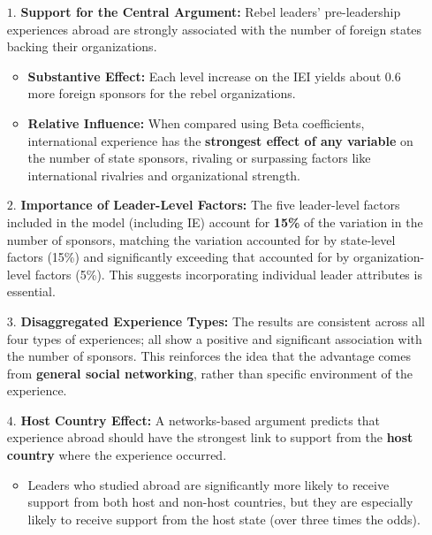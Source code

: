 \documentclass{article}
\begin{document}
    \begin{itemize}
        \item [$1$.] \textbf{Support for the Central Argument:} Rebel
        leaders' pre-leadership experiences abroad are strongly associated
        with the number of foreign states backing their organizations.
        \begin{itemize}
            \item \textbf{Substantive Effect:} Each level increase on the
            IEI yields about 0.6 more foreign sponsors for the rebel
            organizations.
            \item \textbf{Relative Influence:} When compared using Beta
            coefficients, international experience has the
            \textbf{strongest effect of any variable} on the number of state
            sponsors, rivaling or surpassing factors like international
            rivalries and organizational strength.
        \end{itemize}
        \item[$2$.] \textbf{Importance of Leader-Level Factors:} The five
        leader-level factors included in the model (including IE) account for \textbf{15\%} of the variation in the number of sponsors, matching the variation accounted for by state-level factors (15\%) and significantly exceeding that accounted for by organization-level factors (5\%). This suggests incorporating individual leader attributes is essential.
        \item[$3$.] \textbf{Disaggregated Experience Types:} The results are
        consistent across all four types of experiences; all show a positive
        and significant association with the number of sponsors. This
        reinforces the idea that the advantage comes from
        \textbf{general social networking}, rather than specific environment
        of the experience.
        \item[$4$.] \textbf{Host Country Effect:} A networks-based argument
        predicts that experience abroad should have the strongest link to
        support from the \textbf{host country} where the experience occurred.
        \begin{itemize}
            \item Leaders who studied abroad are significantly more likely
            to receive support from both host and non-host countries, but
            they are especially likely to receive support from the host
            state (over three times the odds).
        \end{itemize}

\end{itemize}
\end{document}
